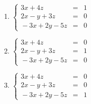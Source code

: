 \documentclass{ximera}
\begin{document}
\begin{multicols}{3}
\begin{enumerate}
\setcounter{enumi}{\value{HW}}

\item $\left\{ \begin{array}{rcr}   3x + 4z & = & 1 \\ 2x - y + 3z & = & 0 \\ \!-3x + 2y - 5z & = & 0  \end{array} \right.$ \label{3by3inversefirst}
\item $\left\{ \begin{array}{rcr}   3x + 4z & = & 0 \\ 2x - y + 3z & = & 1 \\ \!-3x + 2y - 5z & = & 0  \end{array} \right.$
\item $\left\{ \begin{array}{rcr}   3x + 4z & = & 0 \\ 2x - y + 3z & = & 0 \\ \!-3x + 2y - 5z & = & 1  \end{array} \right.$ \label{3by3inverselast}

\setcounter{HW}{\value{enumi}}
\end{enumerate}
\end{multicols}
\end{document}
